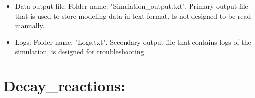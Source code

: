 \documentclass[a4paper,12pt]{article}
\begin{document}
\begin{itemize}
\item Data output file: Folder name: "Simulation\_output.txt". Primary output file that is used to store modeling data in text format. Is not designed to be read manually.

\item Logs: Folder name: "Logs.txt". Secondary output file that contains logs of the simulation, is designed for troubleshooting.

\end{itemize}

\section{Decay\_reactions:}

\vspace{1em}
\end{document}
